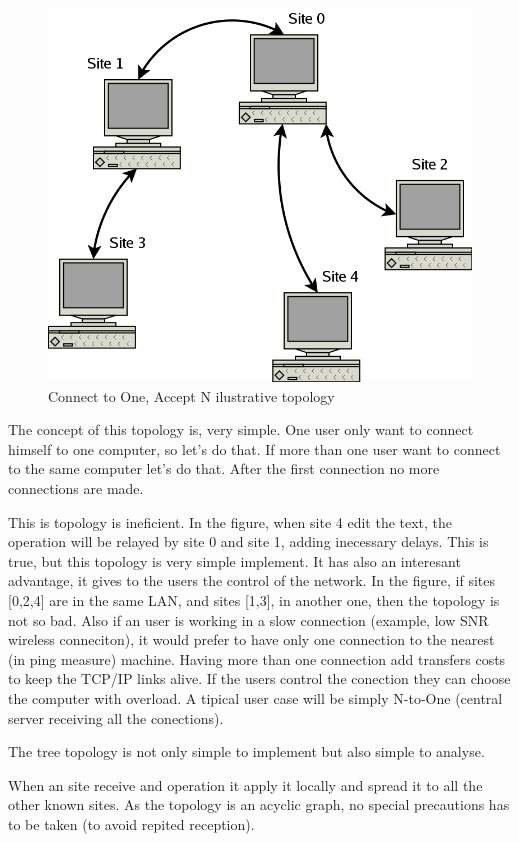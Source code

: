 \documentclass{article}
\begin{document}
\begin{figure}[htbp]
 \begin{center}
    \includegraphics[angle=0,width=0.5\linewidth]{schemas/connect_to_one_accept_N.png}
 \end{center}
 \label{fig:connectooneacceptN}
 \caption{Connect to One, Accept N ilustrative topology}
\end{figure}

The concept of this topology is, very simple. One user only want to connect himself to one computer, so let's do that. If more than one user want to connect to the same computer let's do that. After the first connection no more connections are made.

This is topology is ineficient. In the figure, when site 4 edit the text, the operation will be relayed by site 0 and site 1, adding inecessary delays. This is true, but this topology is very simple implement. It has also an interesant advantage, it gives to the users the control of the network. In the figure, if sites [0,2,4] are in the same LAN, and sites [1,3], in another one, then the topology is not so bad. Also if an user is working in a slow connection (example, low SNR wireless conneciton), it would prefer to have only one connection to the nearest (in ping measure) machine. Having more than one connection add transfers costs to keep the TCP/IP links alive. If the users control the conection they can choose the computer with overload. A tipical user case will be simply N-to-One (central server receiving all the conections).
 
The tree topology is not only simple to implement but also simple to analyse.
    
When an site receive and operation it apply it locally and spread it to all the other known sites. As the topology is an acyclic graph, no special precautions has to be taken (to avoid repited reception).
\end{document}
